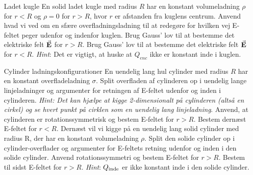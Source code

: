 \documentclass[crop=false, class=memoir]{standalone}
\begin{document}
\begin{opgave}[3]{Ladet kugle}
    En solid ladet kugle med radius $R$ har en konstant volumeladning $\rho$ for $r<R$ og $\rho=0$ for $r>R$, hvor $r$ er afstanden fra kuglens centrum.
    \opg Anvend hvad vi ved om en sfære overfladningsladning til at redegøre for hvilken vej E-feltet peger udenfor og indenfor kuglen.
    \opg Brug Gauss' lov til at bestemme det elektriske felt $\va{E}$ for $r>R$.
    \opg Brug Gauss' lov til at bestemme det elektriske felt $\va{E}$ for $r<R$. \emph{Hint}: Det er vigtigt, at huske at $Q_{enc}$ ikke er konstant inde i kuglen.
\end{opgave}

\begin{opgave}[3]{Cylinder ladningskonfigurationer}
    En uendelig lang hul cylinder med radius $R$ har en konstant overfladeladning $\sigma$.
    \opg Split overfladen af cylinderen op i uendelig lange linjeladninger og argumenter for retningen af E-feltet udenfor og inden i cylinderen. \emph{Hint: Det kan hjælpe at kigge 2-dimensionalt på cylinderen (altså en cirkel) og se hvert punkt på cirklen som en uendelig lang linjeladning}.
    \opg Anvend, at cylinderen er rotationssymmetrisk og bestem E-feltet for $r>R$.
    \opg Bestem dernæst E-feltet for $r<R$.
    \newline
    Dernæst vil vi kigge på en uendelig lang solid cylinder med radius R, der har en konstant volumeladning $\rho$.
    \opg Split den solide cylinder op i cylinder-overflader og argumenter for E-feltets retning udenfor og inden i den solide cylinder.
    \opg Anvend rotationssymmetri og bestem E-feltet for $r>R$.
    \opg Bestem til sidst E-feltet for $r>R$. \emph{Hint}: $Q_\textup{inde}$ er ikke konstant inde i den solide cylinder.
\end{opgave}
\end{document}
